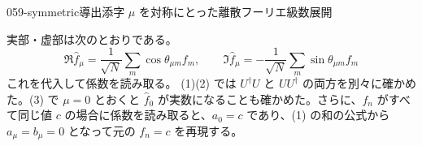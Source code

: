 \documentclass[uplatex,dvipdfmx,a4paper,11pt]{jsarticle}
\begin{document}
\begin{mondai}{059-symmetric}{導出}{添字 $\mu$ を対称にとった離散フーリエ級数展開}
\begin{tadashii}
\[\]
実部・虚部は次のとおりである。
\[
\Re\hat{f}_{\mu}=\frac{1}{\sqrt{N}}\sum_m\cos\theta_{\mu m}f_m,\qquad \Im\hat{f}_{\mu}=-\frac{1}{\sqrt{N}}\sum_m\sin\theta_{\mu m}f_m
\]
これを代入して係数を読み取る。
\kenzan (1)(2) では $U^{\dagger}U$ と $UU^{\dagger}$ の両方を別々に確かめた。(3) で $\mu=0$ とおくと $\hat{f}_0$ が実数になることも確かめた。さらに、$f_n$ がすべて同じ値 $c$ の場合に係数を読み取ると、$a_0=c$ であり、(1) の和の公式から $a_{\mu}=b_{\mu}=0$ となって元の $f_n=c$ を再現する。
\end{tadashii}
\end{mondai}
\end{document}

